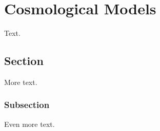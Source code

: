 \chapter{Cosmological Models}
\label{cha: cosmology models}

Text.

\section{Section}

More text.

\subsection{Subsection}

Even more text.